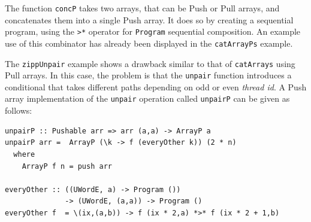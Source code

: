 \documentclass[]{sigplanconf}
\begin{document}
\noindent
The function {\tt concP} takes two arrays, that can be Push or Pull arrays, 
and concatenates them into a single Push array. It does so by creating a 
sequential program, using the {\tt *>*} operator for {\tt Program} sequential
composition. An example use of this combinator has already been displayed in 
the {\tt catArrayPs} example. 




%  
%  
%  


The {\tt zippUnpair} example shows a drawback similar to that of {\tt catArrays} using Pull arrays. 
In this case, the problem is that the {\tt unpair} function introduces 
a conditional that takes different paths depending on odd or even {\em thread id}. 
A Push array implementation of the {\tt unpair} operation called {\tt unpairP}
can be given as follows: 

\begin{codesize}
\begin{verbatim}
unpairP :: Pushable arr => arr (a,a) -> ArrayP a 
unpairP arr =  ArrayP (\k -> f (everyOther k)) (2 * n)
  where 
    ArrayP f n = push arr 
    
everyOther :: ((UWordE, a) -> Program ()) 
              -> (UWordE, (a,a)) -> Program ()
everyOther f  = \(ix,(a,b)) -> f (ix * 2,a) *>* f (ix * 2 + 1,b)  
\end{verbatim}
\end{codesize}
\end{document}
